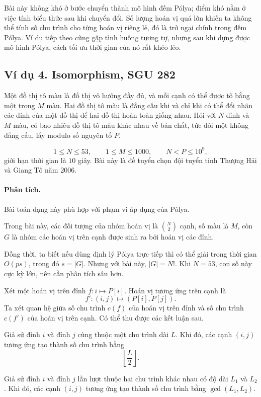 \documentclass[11pt]{article}
\begin{document}
Bài này không khó ở bước chuyển thành mô hình đếm Pólya; điểm khó nằm ở việc
tính biểu thức sau khi chuyển đổi. Số lượng hoán vị quá lớn khiến ta không
thể tính số chu trình cho từng hoán vị riêng lẻ, đó là trở ngại chính trong
đếm Pólya. Ví dụ tiếp theo cũng gặp tình huống tương tự, nhưng sau khi dựng
được mô hình Pólya, cách tối ưu thời gian của nó rất khéo léo.

\subsection{Ví dụ 4. Isomorphism, SGU 282}

Một đồ thị tô màu là đồ thị vô hướng đầy đủ, và mỗi cạnh có thể được tô bằng
một trong \(M\) màu. Hai đồ thị tô màu là đẳng cấu khi và chỉ khi có thể đổi
nhãn các đỉnh của một đồ thị để hai đồ thị hoàn toàn giống nhau. Hỏi với
\(N\) đỉnh và \(M\) màu, có bao nhiêu đồ thị tô màu khác nhau về bản chất,
tức đôi một không đẳng cấu, lấy modulo số nguyên tố \(P\).

\[
  1\le N\le 53,\qquad 1\le M\le 1000,\qquad N<P\le 10^9,
\]
giới hạn thời gian là \(10\) giây. Bài này là đề tuyển chọn đội tuyển tỉnh
Thượng Hải và Giang Tô năm 2006.

\paragraph{Phân tích.}
Bài toán dạng này phù hợp với phạm vi áp dụng của Pólya.

Trong bài này, các đối tượng của nhóm hoán vị là \(\binom{N}{2}\) cạnh, số
màu là \(M\), còn \(G\) là nhóm các hoán vị trên cạnh được sinh ra bởi hoán
vị các đỉnh.

Đồng thời, ta biết nếu dùng định lý Pólya trực tiếp thì có thể giải trong
thời gian \(O(ps)\), trong đó \(s=|G|\). Nhưng với bài này, \(|G|=N!\). Khi
\(N=53\), con số này cực kỳ lớn, nên cần phân tích sâu hơn.

Xét một hoán vị trên đỉnh \(f:i\mapsto P[i]\). Hoán vị tương ứng trên cạnh là
\[
  f':(i,j)\mapsto (P[i],P[j]).
\]
Ta xét quan hệ giữa số chu trình \(c(f)\) của hoán vị trên đỉnh và số chu
trình \(c(f')\) của hoán vị trên cạnh. Có thể thu được các kết luận sau.

Giả sử đỉnh \(i\) và đỉnh \(j\) cùng thuộc một chu trình dài \(L\). Khi đó,
các cạnh \((i,j)\) tương ứng tạo thành số chu trình bằng
\[
  \left\lfloor\frac{L}{2}\right\rfloor.
\]

Giả sử đỉnh \(i\) và đỉnh \(j\) lần lượt thuộc hai chu trình khác nhau có độ
dài \(L_1\) và \(L_2\). Khi đó, các cạnh \((i,j)\) tương ứng tạo thành số chu
trình bằng \(\gcd(L_1,L_2)\).
\end{document}
